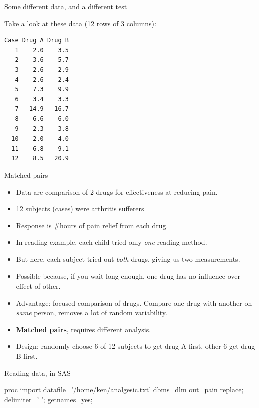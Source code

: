 \documentclass[unknownkeysallowed]{beamer}\usepackage[]{graphicx}\usepackage[]{color}
\begin{document}
\begin{frame}[fragile]{Some different data, and a different test}

Take a look at these data (12 rows of 3 columns):

\bigskip

\begin{multicols}{2}
\begin{verbatim}
Case Drug A Drug B
   1    2.0    3.5
   2    3.6    5.7
   3    2.6    2.9
   4    2.6    2.4
   5    7.3    9.9
   6    3.4    3.3
   7   14.9   16.7
   8    6.6    6.0
   9    2.3    3.8
  10    2.0    4.0
  11    6.8    9.1
  12    8.5   20.9
\end{verbatim}
  
\end{multicols}


\end{frame}

\begin{frame}[fragile]{Matched pairs}
  
  \begin{itemize}
  \item Data are comparison of 2 drugs for effectiveness at reducing pain.
  \item 12 subjects (cases) were arthritis sufferers
  \item Response is \#hours of pain relief from each drug.
  \item In reading example, each child tried only \emph{one} reading method.
  \item But here, each subject tried out \emph{both} drugs, giving us
    two measurements.
  \item Possible because, if you wait long enough, one drug has no
    influence over effect of other.
  \item Advantage: focused comparison of drugs. Compare one drug with
    another on \emph{same} person, removes a lot of random variability.
  \item \textbf{Matched pairs}, requires different analysis.
  \item Design: randomly choose 6 of 12 subjects to get drug A first,
    other 6 get drug B first.
  \end{itemize}

\end{frame}

\begin{frame}[fragile]{Reading data, in SAS}


\begin{Datastep}
proc import
  datafile='/home/ken/analgesic.txt'
    dbms=dlm
    out=pain
    replace;
  delimiter=' ';
  getnames=yes;
\end{Datastep}


  
\end{frame}
\end{document}
